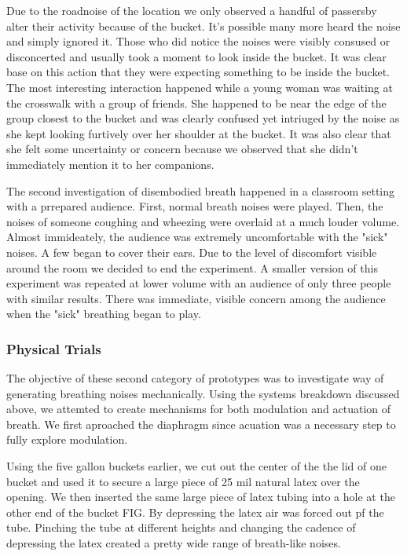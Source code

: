 \documentclass[letterpaper]{article}
\begin{document}
Due to the roadnoise of the location we only observed a handful of passersby alter their activity because of the bucket. It's possible many more heard the noise and simply ignored it. Those who did notice the noises were visibly consused or disconcerted and usually took a moment to look inside the bucket. It was clear base on this action that they were expecting something to be inside the bucket. The most interesting interaction happened while a young woman was waiting at the crosswalk with a group of friends. She happened to be near the edge of the group closest to the bucket and was clearly confused yet intriuged by the noise as she kept looking furtively over her shoulder at the bucket. It was also clear that she felt some uncertainty or concern because we observed that she didn’t immediately mention it to her companions.

The second investigation of disembodied breath happened in a classroom setting with a prrepared audience. First, normal breath noises were played. Then, the noises of someone coughing and wheezing were overlaid at a much louder volume. Almost immideately, the audience was extremely uncomfortable with the "sick" noises. A few began to cover their ears. Due to the level of discomfort visible around the room we decided to end the experiment. A smaller version of this experiment was repeated at lower volume with an audience of only three people with similar results. There was immediate, visible concern among the audience when the "sick" breathing began to play.

\subsubsection{Physical Trials}

The objective of these second category of prototypes was to investigate way of generating breathing noises mechanically. Using the systems breakdown discussed above, we attemted to create mechanisms for both modulation and actuation of breath. We first aproached the diaphragm since acuation was a necessary step to fully explore modulation.

Using the five gallon buckets earlier, we cut out the center of the the lid of one bucket and used it to secure a large piece of 25 mil natural latex over the opening. We then inserted the same large piece of latex tubing into a hole at the other end of the bucket FIG. By depressing the latex air was forced out pf the tube. Pinching the tube at different heights and changing the cadence of depressing the latex created a pretty wide range of breath-like noises. 
\end{document}
